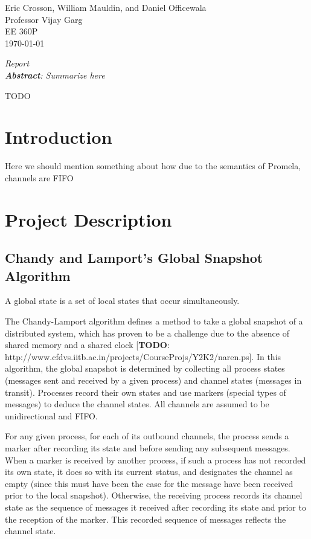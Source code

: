 \documentclass[12pt]{article}
\begin{document}
\begin{flushleft}
Eric Crosson, William Mauldin, and Daniel Officewala \\
Professor Vijay Garg\\
EE 360P \\
\today \\

\begin{center}
\emph{Report}\\
\emph{\textbf{Abstract}: Summarize here}
\end{center}

\setlength{\parindent}{0.5in}

TODO
\section{Introduction}
Here we should mention something about how due to the semantics of Promela, channels are FIFO
\section{Project Description}
\subsection{Chandy and Lamport's Global Snapshot Algorithm}

A global state is a set of local states that occur simultaneously.

The Chandy-Lamport algorithm defines a method to take a global snapshot of a distributed system, which has proven to be a challenge due to the absence of shared memory and a shared clock [\textbf{TODO}: http://www.cfdvs.iitb.ac.in/projects/CourseProjs/Y2K2/naren.ps]. In this algorithm, the global snapshot is determined by collecting all process states (messages sent and received by a given process) and channel states (messages in transit). Processes record their own states and use markers (special types of messages) to deduce the channel states. All channels are assumed to be unidirectional and FIFO.

For any given process, for each of its outbound channels, the process sends a marker after recording its state and before sending any subsequent messages. When a marker is received by another process, if such a process has not recorded its own state, it does so with its current status, and designates the channel as empty (since this must have been the case for the message have been received prior to the local snapshot). Otherwise, the receiving process records its channel state as the sequence of messages it received after recording its state and prior to the reception of the marker. This recorded sequence of messages reflects the channel state.


\end{flushleft}
\end{document}
